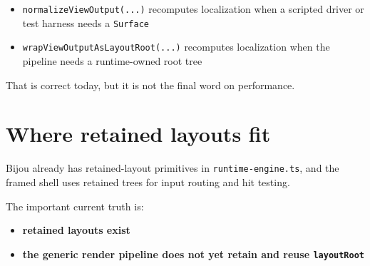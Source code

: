 \begin{itemize}
\tightlist
\item
  \texttt{n\allowbreak{}o\allowbreak{}r\allowbreak{}m\allowbreak{}a\allowbreak{}l\allowbreak{}i\allowbreak{}z\allowbreak{}e\allowbreak{}V\allowbreak{}i\allowbreak{}e\allowbreak{}w\allowbreak{}O\allowbreak{}u\allowbreak{}t\allowbreak{}p\allowbreak{}u\allowbreak{}t\allowbreak{}(\allowbreak{}.\allowbreak{}.\allowbreak{}.\allowbreak{})} recomputes localization when a scripted driver or test harness needs a \texttt{S\allowbreak{}u\allowbreak{}r\allowbreak{}f\allowbreak{}a\allowbreak{}c\allowbreak{}e}
\item
  \texttt{w\allowbreak{}r\allowbreak{}a\allowbreak{}p\allowbreak{}V\allowbreak{}i\allowbreak{}e\allowbreak{}w\allowbreak{}O\allowbreak{}u\allowbreak{}t\allowbreak{}p\allowbreak{}u\allowbreak{}t\allowbreak{}A\allowbreak{}s\allowbreak{}L\allowbreak{}a\allowbreak{}y\allowbreak{}o\allowbreak{}u\allowbreak{}t\allowbreak{}R\allowbreak{}o\allowbreak{}o\allowbreak{}t\allowbreak{}(\allowbreak{}.\allowbreak{}.\allowbreak{}.\allowbreak{})} recomputes localization when the pipeline needs a runtime-owned root tree
\end{itemize}

That is correct today, but it is not the final word on performance.

\section{Where retained layouts fit}\label{record-049-where-retained-layouts-fit}

Bijou already has retained-layout primitives in \texttt{r\allowbreak{}u\allowbreak{}n\allowbreak{}t\allowbreak{}i\allowbreak{}m\allowbreak{}e\allowbreak{}-\allowbreak{}e\allowbreak{}n\allowbreak{}g\allowbreak{}i\allowbreak{}n\allowbreak{}e\allowbreak{}.\allowbreak{}t\allowbreak{}s}, and the framed shell uses retained trees for input routing and hit testing.

The important current truth is:

\begin{itemize}
\tightlist
\item
  \textbf{retained layouts exist}
\item
  \textbf{the generic render pipeline does not yet retain and reuse \texttt{l\allowbreak{}a\allowbreak{}y\allowbreak{}o\allowbreak{}u\allowbreak{}t\allowbreak{}R\allowbreak{}o\allowbreak{}o\allowbreak{}t}}
\end{itemize}

